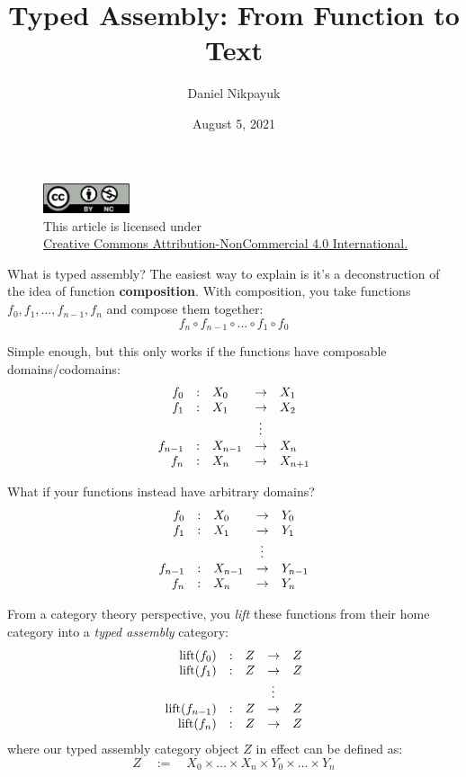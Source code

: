 \documentclass[twoside]{article}
\title{Typed Assembly: From Function to Text}
\author{Daniel Nikpayuk}
\date{August 5, 2021}
\newcommand{\qdefeq}{\ensuremath{\quad :=\quad}}
\newcommand{\strong}[1]{{\bfseries #1}}
\newcommand{\tab}[1][1.125cm]{\hspace{#1}}
\begin{document}
\maketitle
\thispagestyle{empty}

\begin{figure}[h]
\centering
\includegraphics[width=1in]{../../../cc-by-nc.png}\\[0.1in]
\tiny This article is licensed under \\
\href{http://creativecommons.org/licenses/by-nc/4.0/}
{Creative Commons Attribution-NonCommercial 4.0 International.}\\[0.3in]
\end{figure}

What is typed assembly? The easiest way to explain is it's a deconstruction of the idea of function \strong{composition}.
With composition, you take functions $ f_0, f_1, \ldots, f_{n-1}, f_n $ and compose them together:
$$ f_n \circ f_{n-1} \circ \ldots \circ f_1 \circ f_0 $$

Simple enough, but this only works if the functions have composable domains/codomains:
$$ \begin{array}{rllll}
f_0	& :	& X_0		& \to		& X_1		\\
f_1	& :	& X_1		& \to		& X_2		\\
	&	&		& \tab[0.75ex]\vdots		\\
f_{n-1}	& :	& X_{n-1}	& \to		& X_n		\\
f_n	& :	& X_n    	& \to		& X_{n+1}	\\
\end{array} $$

What if your functions instead have arbitrary domains?
$$ \begin{array}{rllll}
f_0	& :	& X_0		& \to		& Y_0		\\
f_1	& :	& X_1		& \to		& Y_1		\\
	&	&		& \tab[0.75ex]\vdots		\\
f_{n-1}	& :	& X_{n-1}	& \to		& Y_{n-1}	\\
f_n	& :	& X_n		& \to		& Y_n		\\
\end{array} $$

\newpage

From a category theory perspective, you \emph{lift} these functions from their home category
into a \emph{typed assembly} category:
$$ \begin{array}{rllll}
\mbox{lift}(f_0)	& :	& Z	& \to		& Z	\\
\mbox{lift}(f_1)	& :	& Z	& \to		& Z	\\
			&	&  	& \tab[0.75ex]\vdots	\\
\mbox{lift}(f_{n-1})	& :	& Z	& \to		& Z	\\
\mbox{lift}(f_n)	& :	& Z	& \to		& Z	\\
\end{array} $$
where our typed assembly category object $ Z $ in effect can be defined as:
$$ Z \qdefeq X_0 \times \ldots \times X_n \times Y_0 \times \ldots \times Y_n $$
\end{document}
